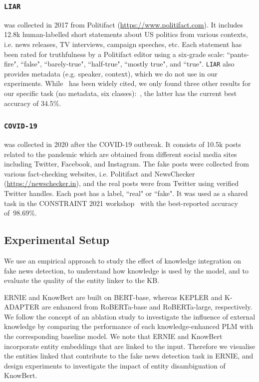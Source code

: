 \documentclass[letterpaper]{article} %
\begin{document}
\subsubsection{\texttt{LIAR}} was collected in 2017 from Politifact (\url{https://www.politifact.com}).
It includes 12.8k human-labelled short statements about US politics from various contexts, i.e. news releases, TV interviews, campaign speeches, etc. 
Each statement has been rated for truthfulness by a Politifact editor using a six-grade scale: ``pants-fire", ``false", ``barely-true", ``half-true", ``mostly true", and ``true".
\texttt{LIAR} also provides metadata (e.g. speaker, context),
which we do not use in our experiments.
While~\citet{wang-2017-liar} has been widely cited, 
we only found three other results for our specific task (no metadata, six classes):~\cite{alhindi-etal-2018-evidence, Liu2019ATM, Chernyavskiy2020RecursiveNT}, the latter has the current best accuracy of 34.5\%.
\subsubsection{\texttt{COVID-19}} was collected in 2020 after the COVID-19 outbreak. 
It consists of 10.5k posts related to the pandemic which are obtained from different social media sites including Twitter, Facebook, and Instagram. 
%
The fake posts were collected from various fact-checking websites, i.e. Politifact and NewsChecker (\url{https://newschecker.in}), and the real posts were from Twitter using verified Twitter handles. 
Each post has a label, ``real" or ``fake".
It was used as a shared task in the CONSTRAINT 2021 workshop~\cite{chakraborty2021combating} with the best-reported accuracy of~98.69\%.

\subsection{Experimental Setup}
We use an empirical approach to study the effect of knowledge integration on fake news detection, to understand how knowledge is used by the model, and to evaluate the quality of the entity linker to the KB.

ERNIE and KnowBert are built on BERT-base, whereas KEPLER and K-ADAPTER are enhanced from RoBERTa-base and RoBERTa-large, respectively.
We follow the concept of an ablation study to investigate the influence of external knowledge by comparing the performance of each knowledge-enhanced PLM with the corresponding baseline model.
We note that ERNIE and KnowBert incorporate entity embeddings that are linked to the input.
Therefore we visualise the entities linked that contribute to the fake news detection task in ERNIE, and design experiments to investigate the impact of entity disambiguation of KnowBert.
\end{document}
